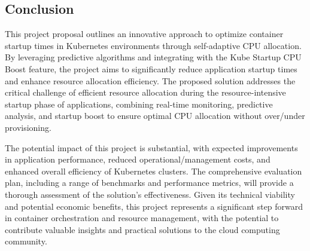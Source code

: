 \vspace{12pt}
\subsection{Conclusion}
\vspace{12pt}

This project proposal outlines an innovative approach to optimize container startup times in Kubernetes environments through self-adaptive CPU allocation. By leveraging predictive algorithms and integrating with the Kube Startup CPU Boost feature, the project aims to significantly reduce application startup times and enhance resource allocation efficiency. The proposed solution addresses the critical challenge of efficient resource allocation during the resource-intensive startup phase of applications, combining real-time monitoring, predictive analysis, and startup boost to ensure optimal CPU allocation without over/under provisioning.

\vspace{12pt}

The potential impact of this project is substantial, with expected improvements in application performance, reduced operational/management costs, and enhanced overall efficiency of Kubernetes clusters. The comprehensive evaluation plan, including a range of benchmarks and performance metrics, will provide a thorough assessment of the solution's effectiveness. Given its technical viability and potential economic benefits, this project represents a significant step forward in container orchestration and resource management, with the potential to contribute valuable insights and practical solutions to the cloud computing community.

\vspace{12pt}